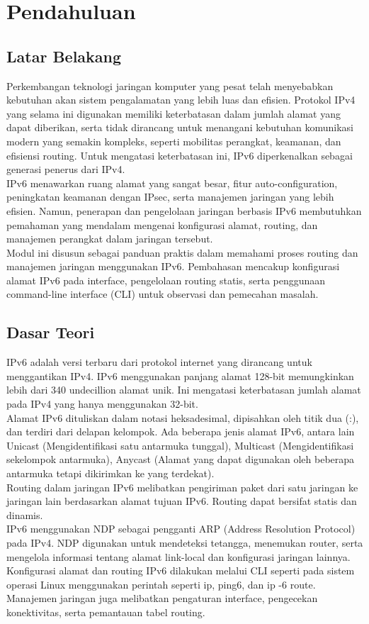 \section{Pendahuluan}
\subsection{Latar Belakang}
Perkembangan teknologi jaringan komputer yang pesat telah menyebabkan kebutuhan akan sistem pengalamatan yang lebih luas dan efisien. Protokol IPv4 yang selama ini digunakan memiliki keterbatasan dalam jumlah alamat yang dapat diberikan, serta tidak dirancang untuk menangani kebutuhan komunikasi modern yang semakin kompleks, seperti mobilitas perangkat, keamanan, dan efisiensi routing. Untuk mengatasi keterbatasan ini, IPv6 diperkenalkan sebagai generasi penerus dari IPv4. \\ IPv6 menawarkan ruang alamat yang sangat besar, fitur auto-configuration, peningkatan keamanan dengan IPsec, serta manajemen jaringan yang lebih efisien. Namun, penerapan dan pengelolaan jaringan berbasis IPv6 membutuhkan pemahaman yang mendalam mengenai konfigurasi alamat, routing, dan manajemen perangkat dalam jaringan tersebut. \\ Modul ini disusun sebagai panduan praktis dalam memahami proses routing dan manajemen jaringan menggunakan IPv6. Pembahasan mencakup konfigurasi alamat IPv6 pada interface, pengelolaan routing statis, serta penggunaan command-line interface (CLI) untuk observasi dan pemecahan masalah.

\subsection{Dasar Teori}
IPv6 adalah versi terbaru dari protokol internet yang dirancang untuk menggantikan IPv4. IPv6 menggunakan panjang alamat 128-bit memungkinkan lebih dari 340 undecillion alamat unik. Ini mengatasi keterbatasan jumlah alamat pada IPv4 yang hanya menggunakan 32-bit. \\ Alamat IPv6 dituliskan dalam notasi heksadesimal, dipisahkan oleh titik dua (:), dan terdiri dari delapan kelompok. Ada beberapa jenis alamat IPv6, antara lain Unicast (Mengidentifikasi satu antarmuka tunggal), Multicast (Mengidentifikasi sekelompok antarmuka), Anycast (Alamat yang dapat digunakan oleh beberapa antarmuka tetapi dikirimkan ke yang terdekat). \\ Routing dalam jaringan IPv6 melibatkan pengiriman paket dari satu jaringan ke jaringan lain berdasarkan alamat tujuan IPv6. Routing dapat bersifat statis dan dinamis. \\ IPv6 menggunakan NDP sebagai pengganti ARP (Address Resolution Protocol) pada IPv4. NDP digunakan untuk mendeteksi tetangga, menemukan router, serta mengelola informasi tentang alamat link-local dan konfigurasi jaringan lainnya. \\ Konfigurasi alamat dan routing IPv6 dilakukan melalui CLI seperti pada sistem operasi Linux menggunakan perintah seperti ip, ping6, dan ip -6 route. Manajemen jaringan juga melibatkan pengaturan interface, pengecekan konektivitas, serta pemantauan tabel routing.

